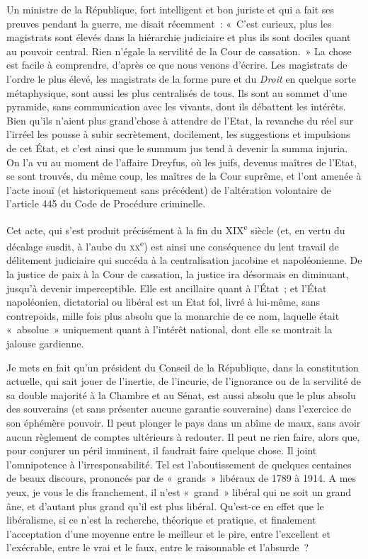 \documentclass[french,twoside]{book} %
\begin{document}
Un ministre de la République, fort intelligent et bon juriste et qui a fait ses preuves pendant la guerre, me disait récemment : « C’est curieux, plus les magistrats sont élevés dans la hiérarchie judiciaire et plus ils sont dociles quant au pouvoir central. Rien n’égale la servilité de la Cour de cassation. » La chose est facile à comprendre, d’après ce que nous venons d’écrire. Les magistrats de l’ordre le plus élevé, les magistrats de la forme pure et du {\itshape Droit} en quelque sorte métaphysique, sont aussi les plus centralisés de tous. Ils sont au sommet d’une pyramide, sans communication avec les vivants, dont ils débattent les intérêts. Bien qu’ils n’aient plus grand’chose à attendre de l’Etat, la revanche du réel sur l’irréel les pousse à subir secrètement, docilement, les suggestions et impulsions de cet État, et c’est ainsi que le summum jus tend à devenir la summa injuria. On l’a vu au moment de l’affaire Dreyfus, où les juifs, devenus maîtres de l’Etat, se sont trouvés, du même coup, les maîtres de la Cour suprême, et l’ont amenée à l’acte inouï (et historiquement sans précédent) de l’altération volontaire de l’article 445 du Code de Procédure criminelle.\par
Cet acte, qui s’est produit précisément à la fin du XIX\textsuperscript{e} siècle (et, en vertu du décalage susdit, à l’aube du \textsc{xx}\textsuperscript{e}) est ainsi une conséquence du lent travail de délitement judiciaire qui succéda à la centralisation jacobine et napoléonienne. De la justice de paix à la Cour de cassation, la justice ira désormais en diminuant, jusqu’à devenir imperceptible. Elle est ancillaire quant à l’État ; et l’État napoléonien, dictatorial ou libéral est un Etat fol, livré à lui-même, sans contrepoids, mille fois plus absolu que la monarchie de ce nom, laquelle était « absolue » uniquement quant à l’intérêt national, dont elle se montrait la jalouse gardienne.\par
Je mets en fait qu’un président du Conseil de la République, dans la constitution actuelle, qui sait jouer de l’inertie, de l’incurie, de l’ignorance ou de la servilité de sa double majorité à la Chambre et au Sénat, est aussi absolu que le plus absolu des souverains (et sans présenter aucune garantie souveraine) dans l’exercice de son éphémère pouvoir. Il peut plonger le pays dans un abîme de maux, sans avoir aucun règlement de comptes ultérieurs à redouter. Il peut ne rien faire, alors que, pour conjurer un péril imminent, il faudrait faire quelque chose. Il joint l’omnipotence à l’irresponsabilité. Tel est l’aboutissement de quelques centaines de beaux discours, prononcés par de « grands » libéraux de 1789 à 1914. A mes yeux, je vous le dis franchement, il n’est « grand » libéral qui ne soit un grand âne, et d’autant plus grand qu’il est plus libéral. Qu’est-ce en effet que le libéralisme, si ce n’est la recherche, théorique et pratique, et finalement l’acceptation d’une moyenne entre le meilleur et le pire, entre l’excellent et l’exécrable, entre le vrai et le faux, entre le raisonnable et l’absurde ?\par
\end{document}

